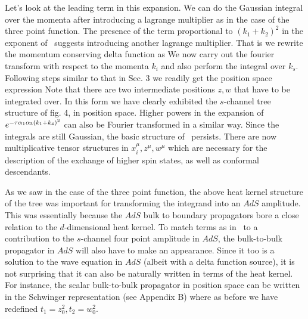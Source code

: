 Let's look at the leading term in this expansion. We can do the Gaussian integral over the 
momenta after introducing a lagrange multiplier as in the case of the three point function. 
The presence of the term proportional to $(k_1+k_2)^2$ in the exponent of \fullfour\
suggests introducing  
another lagrange multiplier. That is we rewrite the momentum conserving delta function as 
\eqn{}
We now carry out the fourier transform with respect to the momenta $k_i$ and also perform the 
integral over $k_s$. Following steps similar to that in Sec. 3
we readily get the position space expression
\eqn{}
Note that there are two intermediate positions $z, w$ 
that have to be integrated over. In this form we have clearly exhibited
the $s$-channel tree structure of fig. 4, in position space. 
Higher powers in the expansion of 
$e^{-{\tau}{\alpha}_1{\alpha}_3(k_1+k_4)^2}$ can also be Fourier transformed in a similar way. Since the 
integrals are still Gaussian, the basic structure of \posfour\ persists. There are now 
multiplicative tensor structures in $x_i^{\mu}, z^{\mu}, w^{\mu}$ which are necessary for the 
description of the exchange of higher spin states, as well as conformal descendants. 

As we saw in the case of the three point function,
the above heat kernel structure of the tree was important for transforming 
the integrand into an $AdS$ amplitude. This was essentially because
the $AdS$ bulk to boundary propagators bore a close relation to
the $d$-dimensional heat kernel. 
To match terms as in \posfour\ to a 
contribution to the $s$-channel four point amplitude in $AdS$, the bulk-to-bulk propagator
in $AdS$ will also have to make an appearance. Since it too is a solution
to the wave equation in $AdS$ (albeit with a delta function source), it is not surprising that 
it can also be naturally written in terms of the heat kernel. 
For instance, the scalar bulk-to-bulk propagator in position space can be written in the 
Schwinger representation (see Appendix B)
\eqn{}
where 
as before we have redefined $t_1=z_0^2, t_2=w_0^2$. 

